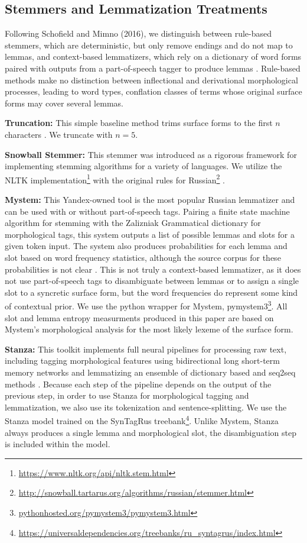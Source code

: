 \documentclass[11pt,a4paper]{article}
\begin{document}
\subsection{Stemmers and Lemmatization Treatments}
\label{sec:stemmers}
Following Schofield and Mimno (2016), we distinguish between rule-based stemmers, which are deterministic, but only remove endings and do not map to lemmas, and context-based lemmatizers, which rely on a dictionary of word forms paired with outputs from a part-of-speech tagger to produce lemmas \cite{schofield-mimno-2016-comparing,Sharoff2011ThePP}. Rule-based methods make no distinction between inflectional and derivational morphological processes, leading to word types, conflation classes of terms whose original surface forms may cover several lemmas.

\textbf{Truncation:} This simple baseline method trims surface forms to the first $n$ characters \cite{schofield-mimno-2016-comparing}. We truncate with $n=5$.

\textbf{Snowball Stemmer:} This stemmer was introduced as a rigorous framework for implementing stemming algorithms for a variety of languages. We utilize the NLTK implementation\footnote{\url{https://www.nltk.org/api/nltk.stem.html}} with the original rules for Russian\footnote{\url{http://snowball.tartarus.org/algorithms/russian/stemmer.html}} \cite{snowball}.


\textbf{Mystem:} This Yandex-owned tool is the most popular Russian lemmatizer and can be used with or without part-of-speech tags. Pairing a finite state machine algorithm for stemming with the Zalizniak Grammatical dictionary for morphological tags, this system outputs a list of possible lemmas and slots for a given token input. The system also produces probabilities for each lemma and slot based on word frequency statistics, although the source corpus for these probabilities is not clear \cite{Segalovich2003AFM}. This is not truly a context-based lemmatizer, as it does not use part-of-speech tags to disambiguate between lemmas or to assign a single slot to a syncretic surface form, but the word frequencies do represent some kind of contextual prior. We use the python wrapper for Mystem, pymystem3\footnote{\url{pythonhosted.org/pymystem3/pymystem3.html}}. All slot and lemma entropy measurments produced in this paper are based on Mystem's morphological analysis for the most likely lexeme of the surface form.


\textbf{Stanza:} This toolkit implements full neural pipelines for processing raw text, including tagging morphological features using bidirectional long short-term memory networks and lemmatizing an ensemble of dictionary based and seq2seq methods \cite{qi2020stanza}. Because each step of the pipeline depends on the output of the previous step, in order to use Stanza for morphological tagging and lemmatization, we also use its tokenization and sentence-splitting. We use the Stanza model trained on the SynTagRus treebank\footnote{\url{https://universaldependencies.org/treebanks/ru_syntagrus/index.html}}. Unlike Mystem, Stanza always produces a single lemma and morphological slot, the disambiguation step is included within the model.
\end{document}
